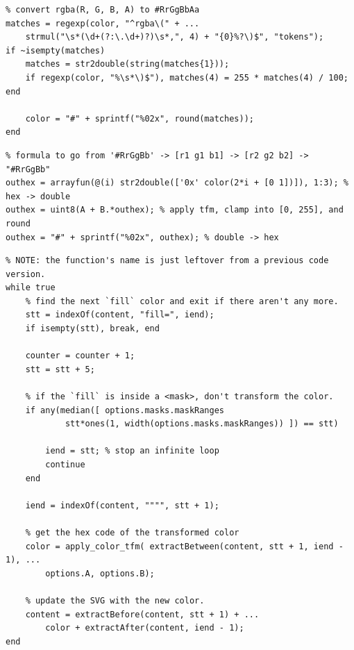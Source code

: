 \documentclass[12pt]{article}
\begin{document}
\vspace{-8px}
\begin{verbatim}
% convert rgba(R, G, B, A) to #RrGgBbAa
matches = regexp(color, "^rgba\(" + ...
    strmul("\s*(\d+(?:\.\d+)?)\s*,", 4) + "{0}%?\)$", "tokens");
if ~isempty(matches)
    matches = str2double(string(matches{1}));
    if regexp(color, "%\s*\)$"), matches(4) = 255 * matches(4) / 100; end

    color = "#" + sprintf("%02x", round(matches));
end
\end{verbatim}
\vfill
{}\vspace{-8px}
\begin{verbatim}
% formula to go from '#RrGgBb' -> [r1 g1 b1] -> [r2 g2 b2] -> "#RrGgBb"
outhex = arrayfun(@(i) str2double(['0x' color(2*i + [0 1])]), 1:3); % hex -> double
outhex = uint8(A + B.*outhex); % apply tfm, clamp into [0, 255], and round
outhex = "#" + sprintf("%02x", outhex); % double -> hex
\end{verbatim}
\vfill
{}\vspace{-8px}
\begin{verbatim}
% NOTE: the function's name is just leftover from a previous code version.
while true
    % find the next `fill` color and exit if there aren't any more.
    stt = indexOf(content, "fill=", iend);
    if isempty(stt), break, end

    counter = counter + 1;
    stt = stt + 5;

    % if the `fill` is inside a <mask>, don't transform the color.
    if any(median([ options.masks.maskRanges
            stt*ones(1, width(options.masks.maskRanges)) ]) == stt)

        iend = stt; % stop an infinite loop
        continue
    end

    iend = indexOf(content, """", stt + 1);

    % get the hex code of the transformed color
    color = apply_color_tfm( extractBetween(content, stt + 1, iend - 1), ...
        options.A, options.B);

    % update the SVG with the new color.
    content = extractBefore(content, stt + 1) + ...
        color + extractAfter(content, iend - 1);
end
\end{verbatim}
\vfill
\vspace{-20px}
\pagebreak
\end{document}
